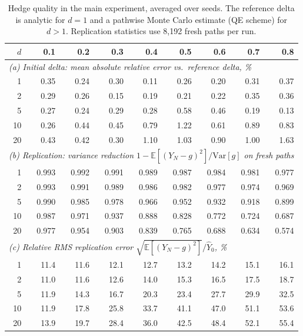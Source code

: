 \begin{table}[t]
\centering\small
\setlength{\tabcolsep}{4.5pt}
\begin{tabular}{rrrrrrrrr}
\toprule
$d$ & 0.1 & 0.2 & 0.3 & 0.4 & \textbf{0.5} & \textbf{0.6} & \textbf{0.7} & \textbf{0.8}\\
\midrule
\multicolumn{9}{l}{\emph{(a) Initial delta: mean absolute relative error vs.\ reference delta, \%}}\\
1 & 0.35 & 0.24 & 0.30 & 0.11 & 0.26 & 0.20 & 0.31 & 0.37\\
2 & 0.29 & 0.26 & 0.15 & 0.19 & 0.21 & 0.22 & 0.35 & 0.36\\
5 & 0.27 & 0.24 & 0.29 & 0.28 & 0.58 & 0.46 & 0.19 & 0.13\\
10 & 0.26 & 0.44 & 0.45 & 0.79 & 1.22 & 0.61 & 0.89 & 0.83\\
20 & 0.43 & 0.42 & 0.30 & 1.10 & 1.03 & 0.90 & 1.00 & 1.63\\
\midrule
\multicolumn{9}{l}{\emph{(b) Replication: variance reduction $1-\mathbb E[(Y_N-g)^2]/\mathrm{Var}[g]$ on fresh paths}}\\
1 & 0.993 & 0.992 & 0.991 & 0.989 & 0.987 & 0.984 & 0.981 & 0.977\\
2 & 0.993 & 0.991 & 0.989 & 0.986 & 0.982 & 0.977 & 0.974 & 0.969\\
5 & 0.990 & 0.985 & 0.978 & 0.966 & 0.952 & 0.932 & 0.918 & 0.899\\
10 & 0.987 & 0.971 & 0.937 & 0.888 & 0.828 & 0.772 & 0.724 & 0.687\\
20 & 0.977 & 0.954 & 0.903 & 0.839 & 0.765 & 0.688 & 0.634 & 0.574\\
\midrule
\multicolumn{9}{l}{\emph{(c) Relative RMS replication error $\sqrt{\mathbb E[(Y_N-g)^2]}/\hat Y_0$, \%}}\\
1 & 11.4 & 11.6 & 12.1 & 12.7 & 13.2 & 14.2 & 15.1 & 16.1\\
2 & 11.0 & 11.6 & 12.6 & 14.0 & 15.3 & 16.5 & 17.5 & 18.7\\
5 & 11.9 & 14.3 & 16.7 & 20.3 & 23.4 & 27.7 & 29.9 & 32.5\\
10 & 11.9 & 17.8 & 25.8 & 33.7 & 41.1 & 47.0 & 51.1 & 53.6\\
20 & 13.9 & 19.7 & 28.4 & 36.0 & 42.5 & 48.4 & 52.1 & 55.4\\
\bottomrule
\end{tabular}
\caption{Hedge quality in the main experiment, averaged over seeds. The reference delta is analytic for $d=1$ and a pathwise Monte Carlo estimate (QE scheme) for $d>1$. Replication statistics use 8{,}192 fresh paths per run.}
\label{tab:hedge}
\end{table}
